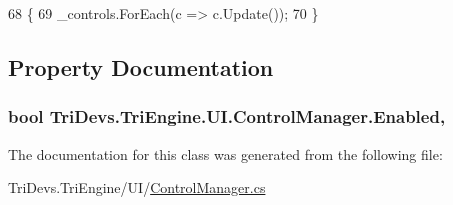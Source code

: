 \begin{DoxyCode}
68         \{
69             \_controls.ForEach(c => c.Update());
70         \}
\end{DoxyCode}


\subsection{Property Documentation}
\hypertarget{class_tri_devs_1_1_tri_engine_1_1_u_i_1_1_control_manager_acf10cfdfcefdba7bfa01f82581d9abc7}{
\subsubsection[{Enabled}]{\setlength{\rightskip}{0pt plus 5cm}bool Tri\-Devs.\-Tri\-Engine.\-U\-I.\-Control\-Manager.\-Enabled\hspace{0.3cm}{\ttfamily [get]}, {\ttfamily [set]}}}\label{class_tri_devs_1_1_tri_engine_1_1_u_i_1_1_control_manager_acf10cfdfcefdba7bfa01f82581d9abc7}


The documentation for this class was generated from the following file\-:\begin{DoxyCompactItemize}
\item 
Tri\-Devs.\-Tri\-Engine/\-U\-I/\hyperlink{_control_manager_8cs}{Control\-Manager.\-cs}\end{DoxyCompactItemize}
